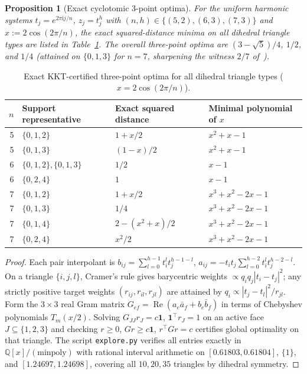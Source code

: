 \documentclass[11pt]{article}
\theoremstyle{plain}
\newtheorem{proposition}[theorem]{Proposition}
\theoremstyle{definition}
\theoremstyle{remark}
\begin{document}
\begin{proposition}[Exact cyclotomic 3-point optima]\label{prop:cyclotomic}
For the uniform harmonic systems $t_j = e^{2\pi\mathrm{i}j/n}$, $z_j = t_j^h$ with $(n,h) \in \{(5,2), (6,3), (7,3)\}$ and $x := 2\cos(2\pi/n)$, the exact squared-distance minima on all dihedral triangle types are listed in Table~\ref{tab:cyclotomic}. The overall three-point optima are $(3-\sqrt{5})/4$, $1/2$, and $1/4$ (attained on $\{0,1,3\}$ for $n=7$, sharpening the witness $2/7$ of~\cite{Zhang2026}).
\end{proposition}

\begin{table}[h]
\centering
\begin{tabular}{@{}rlll@{}}
\toprule
$n$ & Support representative & Exact squared distance & Minimal polynomial of $x$ \\
\midrule
5 & $\{0,1,2\}$ & $1 + x/2$ & $x^2 + x - 1$ \\
5 & $\{0,1,3\}$ & $(1 - x)/2$ & $x^2 + x - 1$ \\
6 & $\{0,1,2\}, \{0,1,3\}$ & $1/2$ & $x - 1$ \\
6 & $\{0,2,4\}$ & $1$ & $x - 1$ \\
7 & $\{0,1,2\}$ & $1 + x/2$ & $x^3 + x^2 - 2x - 1$ \\
7 & $\{0,1,3\}$ & $1/4$ & $x^3 + x^2 - 2x - 1$ \\
7 & $\{0,1,4\}$ & $2 - (x^2 + x)/2$ & $x^3 + x^2 - 2x - 1$ \\
7 & $\{0,2,4\}$ & $x^2/2$ & $x^3 + x^2 - 2x - 1$ \\
\bottomrule
\end{tabular}
\caption{Exact KKT-certified three-point optima for all dihedral triangle types ($x = 2\cos(2\pi/n)$).}\label{tab:cyclotomic}
\end{table}

\begin{proof}
Each pair interpolant is $b_{ij} = \sum_{l=0}^{h-1} t_i^l t_j^{h-1-l}$, $a_{ij} = -t_i t_j \sum_{l=0}^{h-2} t_i^l t_j^{h-2-l}$.
On a triangle $\{i,j,l\}$, Cramer's rule gives barycentric weights $\propto q_i q_j |t_i - t_j|^2$; any strictly positive target weights $(r_{ij}, r_{il}, r_{jl})$ are attained by $q_i \propto |t_j - t_l|^2 / r_{jl}$.
Form the $3 \times 3$ real Gram matrix $G_{ef} = \operatorname{Re}(a_e \bar{a}_f + b_e \bar{b}_f)$ in terms of Chebyshev polynomials $T_m(x/2)$.
Solving $G_{JJ} r_J = c\mathbf{1}$, $\mathbf{1}^\top r_J = 1$ on an active face $J \subseteq \{1,2,3\}$ and checking $r \ge 0$, $Gr \ge c\mathbf{1}$, $r^\top Gr = c$ certifies global optimality on that triangle.
The script \texttt{explore.py} verifies all entries exactly in $\mathbb{Q}[x]/(\text{minpoly})$ with rational interval arithmetic on $[0.61803, 0.61804]$, $\{1\}$, and $[1.24697, 1.24698]$, covering all $10, 20, 35$ triangles by dihedral symmetry.
\end{proof}
\end{document}
